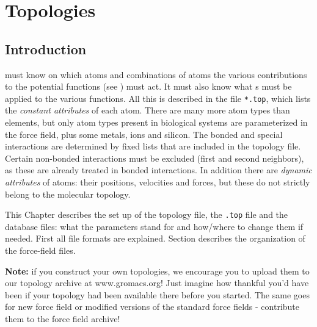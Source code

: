 %
% 
% 
% 
% 
% 
% 
% 
% 
%

\chapter{Topologies}
\label{ch:top}
\section{Introduction}
{\gromacs} must know on which atoms and combinations of atoms the
various contributions to the potential functions (see
) must act. It must
also know what s must be applied to the various
functions. All this is described in the {\em {}} file
\verb'*.top', which lists the {\em constant attributes} of each atom.
There are many more atom types than elements, but only atom types
present in biological systems are parameterized in the force field,
plus some metals, ions and silicon. The bonded and special
interactions are determined by fixed lists that are included in the
topology file. Certain non-bonded interactions must be excluded (first
and second neighbors), as these are already treated in bonded
interactions.  In addition there are {\em dynamic attributes} of
atoms: their positions, velocities and forces, but these do not
strictly belong to the molecular topology.

This Chapter describes the set up of the topology file, the
{\tt *.top} file and the database files: what the parameters
stand for and how/where to change them if needed.
First all file formats are explained.
Section  describes the organization of
the force-field files.

{\bf Note:} if you construct your own topologies, we encourage you
to upload them to our topology archive at www.gromacs.org! Just imagine
how thankful you'd have been if your topology had been available
there before you started. The same goes for new force field or
modified versions of the standard force fields - contribute them
to the force field archive!

